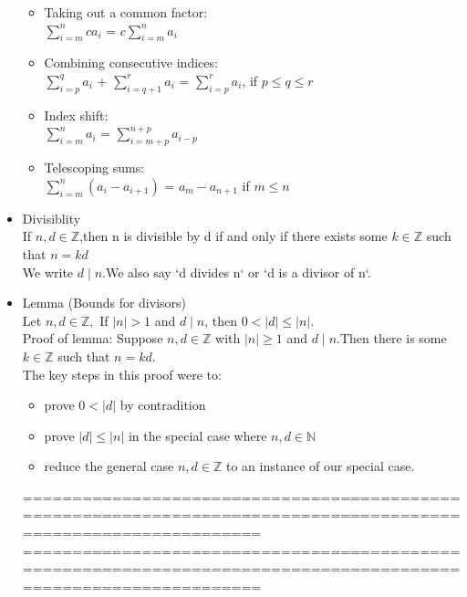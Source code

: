 \documentclass{article}
\begin{document}
\begin{itemize}
\begin{itemize}
\item Taking out a common factor:\\
 $\sum_{i = m}^n ca_i$ =  $c \sum_{i = m}^n a_i$
 
 \item Combining consecutive indices:\\
 $\sum_{i = p}^q a_i$ + $\sum_{i = q+1}^r a_i$ = $\sum_{i = p}^r a_i$,  if $p \leq q \leq r$
 
 \item Index shift:\\
 $\sum_{i = m}^n a_i$ =  $\sum_{i = m+p}^{n + p} a_{i - p}$ 
 
 \item Telescoping sums:\\
  $\sum_{i = m}^n (a_i - a_{i+1})$ = $a_m - a_{n+1}$ if $m \leq n$
\end{itemize}

\item Divisiblity\\
If $n,d \in \mathbb{Z}$,then n is divisible by d if and only if there exists some $k \in \mathbb{Z}$ such that $n = kd$ \\
We write $d \mid n$.We also say `d divides n` or `d is a divisor of n`.
	
\item Lemma (Bounds for divisors)\\
Let $n,d \in \mathbb{Z},$ If $|n| > 1$ and $d \mid n$, then $0 < |d| \leq |n|$.\\
Proof of lemma: Suppose $n,d \in \mathbb{Z}$ with $|n| \geq 1$ and $d \mid n$.Then there is some $k \in \mathbb{Z}$ such that $n = kd$.\\

The key steps in this proof were to:
\begin{itemize}
\item prove $0 < |d|$ by contradition
\item prove $|d| \leq |n|$ in the special case where $n, d \in \mathbb{N}$
\item reduce the general case $n, d \in \mathbb{Z}$ to an instance of our
special case.
\end{itemize}

================================================================================================================
\newpage
================================================================================================================


\end{itemize}
\end{document}
